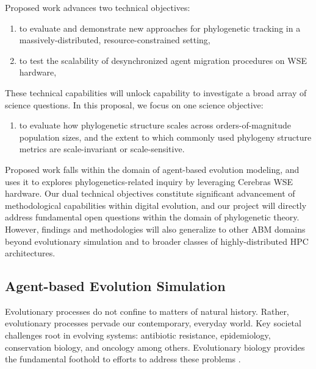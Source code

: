 Proposed work advances two technical objectives:
\begin{enumerate}
\item to evaluate and demonstrate new approaches for phylogenetic tracking in a massively-distributed, resource-constrained setting,
\item to test the scalability of desynchronized agent migration procedures on WSE hardware,
\end{enumerate}

These technical capabilities will unlock capability to investigate a broad array of science questions.
In this proposal, we focus on one science objective:
\begin{enumerate}
\item to evaluate how phylogenetic structure scales across orders-of-magnitude population sizes, and the extent to which commonly used phylogeny structure metrics are scale-invariant or scale-sensitive.
\end{enumerate}

Proposed work falls within the domain of agent-based evolution modeling, and uses it to explores phylogenetics-related inquiry by leveraging Cerebras WSE hardware.
Our dual technical objectives constitute significant advancement of methodological capabilities within digital evolution, and our project will directly address fundamental open questions within the domain of phylogenetic theory.
However, findings and methodologies will also generalize to other ABM domains beyond evolutionary simulation and to broader classes of highly-distributed HPC architectures.

\subsection{Agent-based Evolution Simulation}

Evolutionary processes do not confine to matters of natural history.
Rather, evolutionary processes pervade our contemporary, everyday world.
Key societal challenges root in evolving systems: antibiotic resistance, epidemiology, conservation biology, and oncology among others.  %
Evolutionary biology provides the fundamental foothold to efforts to address these problems \citep{aktipis2013evolutionary}.

